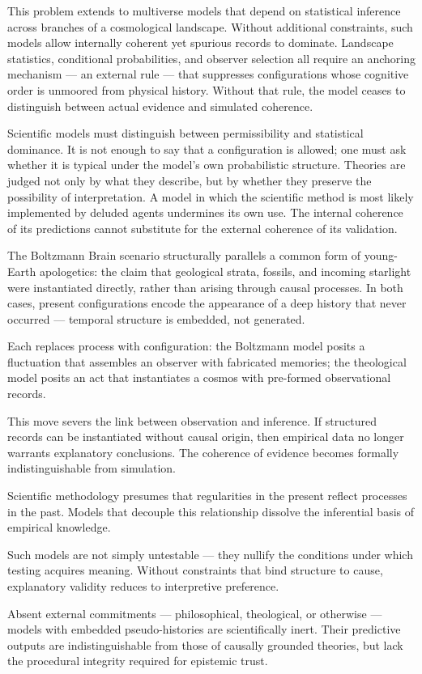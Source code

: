 This problem extends to multiverse models that depend on statistical inference across branches of a cosmological landscape. Without additional constraints, such models allow internally coherent yet spurious records to dominate. Landscape statistics, conditional probabilities, and observer selection all require an anchoring mechanism — an external rule — that suppresses configurations whose cognitive order is unmoored from physical history. Without that rule, the model ceases to distinguish between actual evidence and simulated coherence.

Scientific models must distinguish between permissibility and statistical dominance. It is not enough to say that a configuration is allowed; one must ask whether it is typical under the model’s own probabilistic structure. Theories are judged not only by what they describe, but by whether they preserve the possibility of interpretation. A model in which the scientific method is most likely implemented by deluded agents undermines its own use. The internal coherence of its predictions cannot substitute for the external coherence of its validation.

\clearpage

\begin{commentary}
The Boltzmann Brain scenario structurally parallels a common form of young-Earth apologetics: the claim that geological strata, fossils, and incoming starlight were instantiated directly, rather than arising through causal processes. In both cases, present configurations encode the appearance of a deep history that never occurred — temporal structure is embedded, not generated.

Each replaces process with configuration: the Boltzmann model posits a fluctuation that assembles an observer with fabricated memories; the theological model posits an act that instantiates a cosmos with pre-formed observational records.

This move severs the link between observation and inference. If structured records can be instantiated without causal origin, then empirical data no longer warrants explanatory conclusions. The coherence of evidence becomes formally indistinguishable from simulation.

Scientific methodology presumes that regularities in the present reflect processes in the past. Models that decouple this relationship dissolve the inferential basis of empirical knowledge.

Such models are not simply untestable — they nullify the conditions under which testing acquires meaning. Without constraints that bind structure to cause, explanatory validity reduces to interpretive preference.

Absent external commitments — philosophical, theological, or otherwise — models with embedded pseudo-histories are scientifically inert. Their predictive outputs are indistinguishable from those of causally grounded theories, but lack the procedural integrity required for epistemic trust.
\end{commentary}

